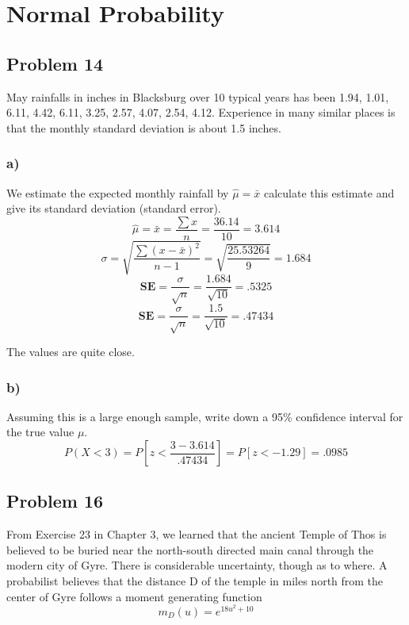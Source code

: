 \documentclass{article}
\begin{document}
\section*{Normal Probability}
\subsection*{Problem 14}
May rainfalls in inches in Blacksburg over 10 typical years has been 1.94, 1.01, 6.11, 4.42, 6.11, 3.25, 2.57, 4.07, 2.54, 4.12. Experience in many similar places is that the monthly standard deviation is about 1.5 inches.
\subsubsection*{a)}
We  estimate  the  expected  monthly  rainfall  by $\hat{\mu} = \bar{x}$  calculate  this  estimate  and  give  its standard deviation (standard error).
\begin{equation}
    \hat{\mu} = \bar{x} = \frac{\sum x}{n} = \frac{36.14}{10} = \boxed{3.614}
\end{equation}
\begin{equation}
    \sigma = \sqrt{\frac{\sum(x-\bar{x})^2}{n-1}} = \sqrt{\frac{25.53264}{9}} = \boxed{1.684}
\end{equation}
\begin{equation}
    \textbf{SE} = \frac{\sigma}{\sqrt{n}} = \frac{1.684}{\sqrt{10}} = \boxed{.5325}
\end{equation}
\begin{equation}
    \textbf{SE} = \frac{\sigma}{\sqrt{n}} = \frac{1.5}{\sqrt{10}} = \boxed{.47434}
\end{equation}
\begin{center}
    The values are quite close.
\end{center}
\subsubsection*{b)}
Assuming this is a large enough sample, write down a 95\% confidence interval for the true value $\mu$.
\begin{equation}
    P(X < 3) = P\left[z < \frac{3-3.614}{.47434}\right] = P[z < -1.29] = \boxed{.0985}
\end{equation}
\subsection*{Problem 16}
From Exercise 23 in Chapter 3, we learned that the ancient Temple of Thos is believed to be  buried  near  the  north-south  directed  main  canal  through  the  modern  city  of Gyre.  There  is considerable  uncertainty,  though  as  to  where.  A  probabilist  believes  that  the  distance D of  the temple in miles north from the center of Gyre follows a moment generating function
\begin{equation}
    m_D(u) = e^{18u^2 + 10}
\end{equation}
\end{document}
